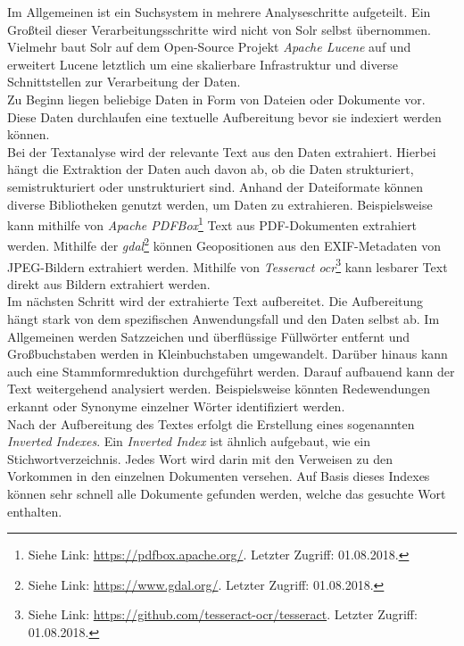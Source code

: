 \noindent
Im Allgemeinen ist ein Suchsystem in mehrere Analyseschritte aufgeteilt. Ein Großteil dieser Verarbeitungsschritte wird nicht von Solr selbst übernommen. Vielmehr baut Solr auf dem Open-Source Projekt \textit{Apache Lucene\texttrademark\thinspace} auf und erweitert Lucene letztlich um eine skalierbare Infrastruktur und diverse Schnittstellen zur Verarbeitung der Daten.\\
Zu Beginn liegen beliebige Daten in Form von Dateien oder Dokumente vor. Diese Daten durchlaufen eine textuelle Aufbereitung bevor sie indexiert werden können.\\ 
Bei der Textanalyse wird der relevante Text aus den Daten extrahiert. Hierbei hängt die Extraktion der Daten auch davon ab, ob die Daten strukturiert, semistrukturiert oder unstrukturiert sind. Anhand der Dateiformate können diverse Bibliotheken genutzt werden, um Daten zu extrahieren. Beispielsweise kann mithilfe von \textit{Apache PDFBox\textsuperscript{\textregistered}}\footnote{Siehe Link: \url{https://pdfbox.apache.org/}. Letzter Zugriff: 01.08.2018.} Text aus PDF-Dokumenten extrahiert werden. Mithilfe der \textit{\gls{gdal}}\footnote{Siehe Link: \url{https://www.gdal.org/}. Letzter Zugriff: 01.08.2018.} können Geopositionen aus den EXIF-Metadaten von JPEG-Bildern extrahiert werden. Mithilfe von \textit{Tesseract \acrshort{ocr}}\footnote{Siehe Link: \url{https://github.com/tesseract-ocr/tesseract}. Letzter Zugriff: 01.08.2018.} kann lesbarer Text direkt aus Bildern extrahiert werden.\cite[S. 39]{solr_search}\\

\noindent
Im nächsten Schritt wird der extrahierte Text aufbereitet. Die Aufbereitung hängt stark von dem spezifischen Anwendungsfall und den Daten selbst ab. Im Allgemeinen werden Satzzeichen und überflüssige Füllwörter entfernt und Großbuchstaben werden in Kleinbuchstaben umgewandelt. Darüber hinaus kann auch eine Stammformreduktion durchgeführt werden. Darauf aufbauend kann der Text weitergehend analysiert werden. Beispielsweise könnten Redewendungen erkannt oder Synonyme einzelner Wörter identifiziert werden.\cite[S.44]{solr_search}\\

\noindent
Nach der Aufbereitung des Textes erfolgt die Erstellung eines sogenannten \textit{Inverted Indexes}. Ein \textit{Inverted Index} ist ähnlich aufgebaut, wie ein Stichwortverzeichnis. Jedes Wort wird darin mit den Verweisen zu den Vorkommen in den einzelnen Dokumenten versehen. Auf Basis dieses Indexes können sehr schnell alle Dokumente gefunden werden, welche das gesuchte Wort enthalten.\cite[S. 47]{solr_search}\\

